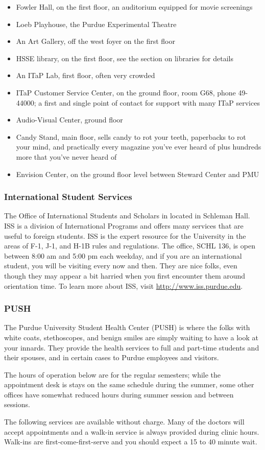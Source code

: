\begin{itemize}
	\item Fowler Hall, on the first floor, an auditorium equipped for movie screenings
	\item Loeb Playhouse, the Purdue Experimental Theatre
	\item An Art Gallery, off the west foyer on the first floor
	\item HSSE library, on the first floor, see the section on libraries for details
	\item An ITaP Lab, first floor, often very crowded
	\item ITaP Customer Service Center, on the ground floor, room G68, phone 49-44000; a first and single point of contact for support with many ITaP services
	\item Audio-Visual Center, ground floor
	\item Candy Stand, main floor, sells candy to rot your teeth, paperbacks to rot your mind, and practically every magazine you've ever heard of plus hundreds more that you've never heard of
	\item Envision Center, on the ground floor level between Steward Center and PMU
\end{itemize}


\subsubsection{International Student Services}
The Office of International Students and Scholars in located in Schleman Hall. ISS is a division of International Programs and offers many services that are useful to foreign students. ISS is the expert resource for the University in the areas of F-1, J-1, and H-1B rules and regulations. The office, SCHL 136, is open between 8:00 am and 5:00 pm each weekday, and if you are an international student, you will be visiting every now and then. They are nice folks, even though they may appear a bit harried when you first encounter them around orientation time. To learn more about ISS, visit \url{http://www.iss.purdue.edu}.



\subsubsection{PUSH}
The Purdue University Student Health Center (PUSH) is where the folks with white coats, stethoscopes, and benign smiles are simply waiting to have a look at your innards. They provide the health services to full and part-time students and their spouses, and in certain cases to Purdue employees and visitors.

The hours of operation below are for the regular semesters; while the appointment desk is stays on the same schedule during the summer, some other offices have somewhat reduced hours during summer session and between sessions.

The following services are available without charge. Many of the doctors will accept appointments and a walk-in service is always provided during clinic hours. Walk-ins are first-come-first-serve and you should expect a 15 to 40 minute wait.




